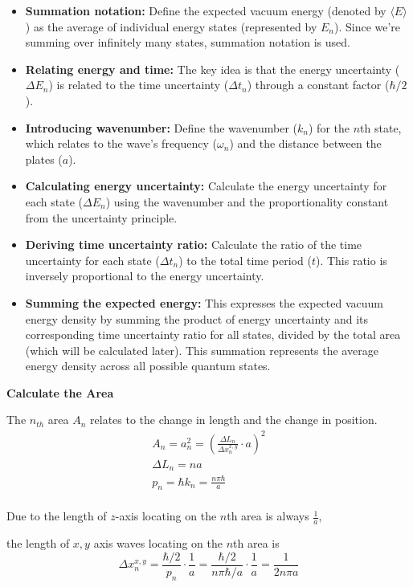 \begin{itemize}
    \item \textbf{Summation notation:} Define the expected vacuum energy (denoted by $\langle E \rangle$ ) 
    as the average of individual energy states (represented by $E_n$). 
    Since we're summing over infinitely many states, summation notation is used.
    \item \textbf{Relating energy and time:} The key idea is that the energy uncertainty ($\Delta E_n$) is related 
    to the time uncertainty ($\Delta t_n$) through a constant factor ($\hbar/2$).
    \item \textbf{Introducing wavenumber:} Define the wavenumber ($k_n$) for the $n$th state, 
    which relates to the wave's frequency ($\omega_n$) and the distance between the plates ($a$).
    \item \textbf{Calculating energy uncertainty:} Calculate the energy uncertainty for each state ($\Delta E_n$)
     using the wavenumber and the proportionality constant from the uncertainty principle.
    \item \textbf{Deriving time uncertainty ratio:} Calculate the ratio of the time uncertainty for each state ($\Delta t_n$)
     to the total time period ($t$). This ratio is inversely proportional to the energy uncertainty.
    \item \textbf{Summing the expected energy:} This expresses the expected vacuum energy density by summing 
    the product of energy uncertainty and its corresponding time uncertainty ratio for all states, 
    divided by the total area (which will be calculated later). 
    This summation represents the average energy density across all possible quantum states.
\end{itemize}
\noindent\textbf{Calculate the Area}
\par
The \(n_{th}\) area \(A_n\) relates to the change in length and the change in position.
    \begin{align*}
    &A_n = a_n^2 = (\frac{\Delta L_n}{\Delta x_n^{x,y}} \cdot a)^2&\\
    &\Delta L_n = n a&\\
    &p_n = \hbar k_n = \frac{n \pi \hbar}{a}&\\
    \end{align*}

    Due to the length of $z$-axis locating on the $n$th area is always $\frac{1}{a}$,
    
    the length of $x, y$ axis waves locating on the $n$th area is
    \[\Delta x_n^{x, y} = \frac{\hbar/2}{p_n} \cdot \frac{1}{a} = \frac{\hbar/2}{n \pi \hbar/a} \cdot \frac{1}{a} = \frac{1}{2 n \pi a}\]
    
